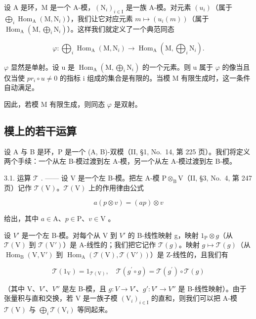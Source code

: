 设 A 是环，M 是一个 A-模，\((\mathrm{N}_{i})_{i\in\mathrm{I}}\) 是一族 A-模。对元素 \((u_{i})\)（属于 \(\bigoplus_{i}\operatorname{Hom}_{\mathrm{A}}(\mathrm{M},\mathrm{N}_{i})\)），我们让它对应元素 \(m\mapsto(u_{i}(m))\)（属于 \(\operatorname{Hom}_{\mathrm{A}}(\mathrm{M},\bigoplus_{i}\mathrm{N}_{i})\)）。这样我们就定义了一个典范同态

\[
\varphi : \bigoplus_ {i} \operatorname{Hom} _ {\mathrm{A}} (\mathrm{M}, \mathrm{N} _ {i}) \longrightarrow \operatorname{Hom} _ {\mathrm{A}} \left(\mathrm{M}, \bigoplus_ {i} \mathrm{N} _ {i}\right).
\]

\(\varphi\) 显然是单射。设 u 是 \(\operatorname{Hom}_{\mathrm{A}}(\mathrm{M},\bigoplus_{i}\mathrm{N}_{i})\) 的一个元素。则 u 属于 \(\varphi\) 的像当且仅当使 \(pr_{i}\circ u\neq0\) 的指标 i 组成的集合是有限的。当模 M 有限生成时，这一条件自动满足。

因此，若模 M 有限生成，则同态 \(\varphi\) 是双射。

\subsection{模上的若干运算}

设 A 与 B 是环，P 是一个 (A, B)-双模（II, §1, No.~14, 第 225 页）。我们将定义两个手续：一个从左 B-模过渡到左 A-模，另一个从左 A-模过渡到左 B-模。

3.1. 运算 \(\mathcal{T}\) . —— 设 V 是一个左 B-模。把左 A-模 \(\mathrm{P} \otimes_{\mathrm{B}} \mathrm{V}\)（II, §3, No.~4, 第 247 页）记作 \(\mathcal{T}(\mathrm{V})\)。\(\mathcal{T}(\mathrm{V})\) 上的作用律由公式

\[
a (p \otimes v) = (a p) \otimes v\tag{1}
\]

给出，其中 \(a \in \mathrm{A}\)、\(p \in \mathrm{P}\)、\(v \in \mathrm{V}\) 。

设 \(V'\) 是一个左 B-模。对每个从 V 到 \(V'\) 的 B-线性映射 g，映射 \(1_{\mathrm{P}} \otimes g\)（从 \(\mathcal{T}(\mathrm{V})\) 到 \(\mathcal{T}(\mathrm{V}')\)）是 A-线性的；我们把它记作 \(\mathcal{T}(g)\)。映射 \(g \mapsto \mathcal{T}(g)\)（从 \(\operatorname{Hom}_{\mathrm{B}}(\mathrm{V}, \mathrm{V}')\) 到 \(\operatorname{Hom}_{\mathrm{A}}(\mathcal{T}(\mathrm{V}), \mathcal{T}(\mathrm{V}'))\)）是 Z-线性的，且我们有

\[
\mathcal {T} (1 _ {\mathrm{V}}) = 1 _ {\mathcal {T} (\mathrm{V})}, \quad \mathcal {T} (g ^ {\prime} \circ g) = \mathcal {T} (g ^ {\prime}) \circ \mathcal {T} (g)\tag{2}
\]

（其中 V、\(V'\)、\(V''\) 是左 B-模，且 \(g : V \to V'\)、\(g' : V' \to V''\) 是 B-线性映射）。由于张量积与直和交换，若 V 是一族子模 \((\mathrm{V}_{i})_{i \in \mathrm{I}}\) 的直和，则我们可以把 A-模 \(\mathcal{T}(\mathrm{V})\) 与 \(\bigoplus_{i} \mathcal{T}(\mathrm{V}_{i})\) 等同起来。

